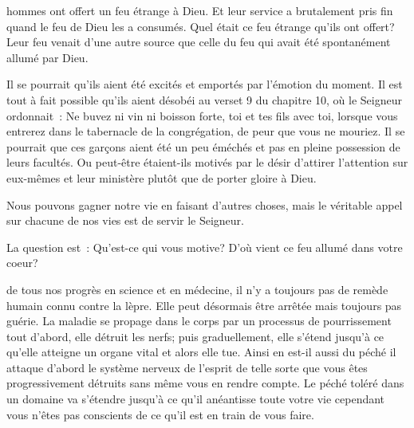 
 hommes ont offert un feu étrange à Dieu.
 Et leur service a brutalement pris fin quand le feu de Dieu les a consumés.
 Quel était ce feu étrange qu'ils ont offert?
 Leur feu venait d'une autre source que celle du feu
 qui avait été spontanément allumé par Dieu.

Il se pourrait qu'ils aient été excités et emportés par l'émotion du moment.
 Il est tout à fait possible qu'ils aient désobéi au verset 9 du chapitre 10,
 où le Seigneur ordonnait~:
 \og Ne buvez ni vin ni boisson forte, toi et tes fils avec toi,
 lorsque vous entrerez dans le tabernacle de la congrégation,
 de peur que vous ne mouriez. \fg{}
 Il se pourrait que ces garçons aient été un peu éméchés
 et pas en pleine possession de leurs facultés.
 Ou peut-être étaient-ils motivés par le désir d'attirer
 l'attention sur eux-mêmes et leur ministère plutôt que de porter gloire à Dieu.


Nous pouvons gagner notre vie en faisant d'autres choses,
 mais le véritable appel sur chacune de nos vies est de servir le Seigneur.

La question est~: Qu'est-ce qui vous motive?
 D'où vient ce feu allumé dans votre coeur? 

\dvrule






 de tous nos progrès en science et en médecine,
 il n'y a toujours pas de remède humain connu contre la lèpre.
 Elle peut désormais être arrêtée mais toujours pas guérie.
 La maladie se propage dans le corps par un processus de pourrissement
 \ocadr{}tout d'abord, elle détruit les nerfs;
 puis graduellement, elle s'étend jusqu'à ce qu'elle atteigne
 un organe vital et alors elle tue.
 Ainsi en est-il aussi du péché \ocadr{}il attaque d'abord le système nerveux
 de l'esprit de telle sorte que vous êtes progressivement détruits
 sans même vous en rendre compte.
 Le péché toléré dans un domaine va s'étendre jusqu'à ce qu'il anéantisse
 toute votre vie \ocadr{}cependant vous n'êtes pas conscients
 de ce qu'il est en train de vous faire. 

